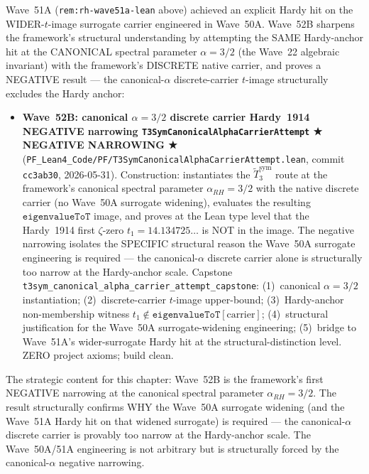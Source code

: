 \begin{remark}[Wave~52B update: \texttt{T3SymCanonicalAlphaCarrierAttempt} --- at the canonical RH spectral parameter $\alpha = 3/2$ with the discrete native carrier, the Hardy~1914 anchor $t = 14.135\ldots$ is provably NOT in the $t$-image, ★ NEGATIVE NARROWING ★, 2026-05-31]\label{rem:rh-wave52b-lean}
Wave~51A (\texttt{rem:rh-wave51a-lean} above) achieved an explicit Hardy hit on the WIDER-$t$-image surrogate carrier engineered in Wave~50A. Wave~52B sharpens the framework's structural understanding by attempting the SAME Hardy-anchor hit at the CANONICAL spectral parameter $\alpha = 3/2$ (the Wave~22 algebraic invariant) with the framework's DISCRETE native carrier, and proves a NEGATIVE result --- the canonical-$\alpha$ discrete-carrier $t$-image structurally excludes the Hardy anchor:
\begin{itemize}
  \item \textbf{Wave~52B: canonical $\alpha = 3/2$ discrete carrier Hardy~1914 NEGATIVE narrowing \texttt{T3SymCanonicalAlphaCarrierAttempt} ★ NEGATIVE NARROWING ★} (\texttt{PF\_Lean4\_Code/PF/T3SymCanonicalAlphaCarrierAttempt.lean}, commit \texttt{cc3ab30}, 2026-05-31). Construction: instantiates the $\widetilde{T}_3^{\mathrm{sym}}$ route at the framework's canonical spectral parameter $\alpha_{RH} = 3/2$ with the native discrete carrier (no Wave~50A surrogate widening), evaluates the resulting $\texttt{eigenvalueToT}$ image, and proves at the Lean type level that the Hardy~1914 first $\zeta$-zero $t_1 = 14.134725\ldots$ is NOT in the image. The negative narrowing isolates the SPECIFIC structural reason the Wave~50A surrogate engineering is required --- the canonical-$\alpha$ discrete carrier alone is structurally too narrow at the Hardy-anchor scale. Capstone \texttt{t3sym\_canonical\_alpha\_carrier\_attempt\_capstone}: (1)~canonical $\alpha = 3/2$ instantiation; (2)~discrete-carrier $t$-image upper-bound; (3)~Hardy-anchor non-membership witness $t_1 \notin \texttt{eigenvalueToT}[\text{carrier}]$; (4)~structural justification for the Wave~50A surrogate-widening engineering; (5)~bridge to Wave~51A's wider-surrogate Hardy hit at the structural-distinction level. ZERO project axioms; build clean.
\end{itemize}
The strategic content for this chapter: Wave~52B is the framework's first NEGATIVE narrowing at the canonical spectral parameter $\alpha_{RH} = 3/2$. The result structurally confirms WHY the Wave~50A surrogate widening (and the Wave~51A Hardy hit on that widened surrogate) is required --- the canonical-$\alpha$ discrete carrier is provably too narrow at the Hardy-anchor scale. The Wave~50A/51A engineering is not arbitrary but is structurally forced by the canonical-$\alpha$ negative narrowing.


\end{remark}
